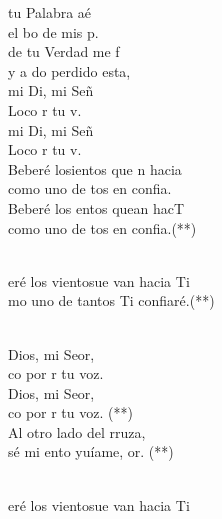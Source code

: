 \begin{cancion}[Hacia Ti][Ixcís]%
	tu Palabra aé\\
	el bo de mis p.\\
	de tu Verdad me f\\
	y a do perdido esta,\\
	mi Di, mi Señ\\
	Loco  r tu v. \\
	mi Di, mi Señ\\
	Loco  r tu v.\\
	Beberé losientos que n hacia\\
	como uno de tos en  confia.\\
	Beberé los entos quean hacT\\
	como uno de tos en  confia.(**)\\\jump\\
	\begin{chorus}%
	eré los vientosue van hacia Ti\\
	mo uno de tantos Ti confiaré.(**)\\
	\end{chorus}%
	\jump\\
	Dios, mi Seor,\\
	co por r tu voz.\\
	Dios, mi Seor,\\
	co por r tu voz. (**)\\
	Al otro lado del rruza,\\
	sé mi ento yuíame, or. (**) \\\jump\\
	\begin{chorus}%
	eré los vientosue van hacia Ti\\

\end{chorus}
\end{cancion}
